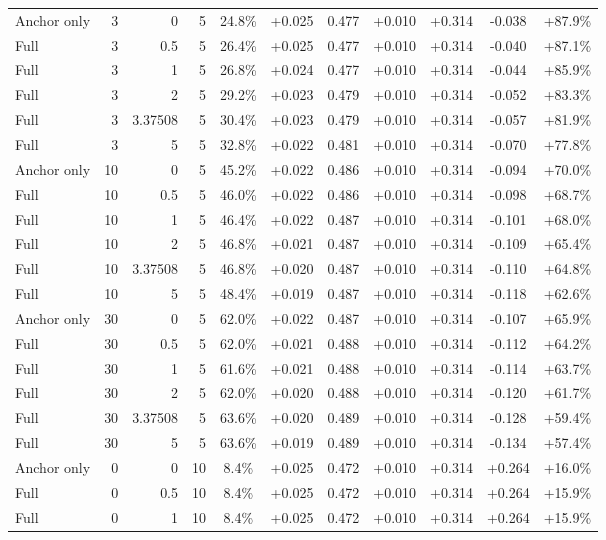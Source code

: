 \begin{table}[htbp]
\begin{tabular}{lrrrccccccc}
Anchor only & 3 & 0 & 5 & 24.8\% & +0.025 & 0.477 & +0.010 & +0.314 & -0.038 & +87.9\% \\
Full & 3 & 0.5 & 5 & 26.4\% & +0.025 & 0.477 & +0.010 & +0.314 & -0.040 & +87.1\% \\
Full & 3 & 1 & 5 & 26.8\% & +0.024 & 0.477 & +0.010 & +0.314 & -0.044 & +85.9\% \\
Full & 3 & 2 & 5 & 29.2\% & +0.023 & 0.479 & +0.010 & +0.314 & -0.052 & +83.3\% \\
Full & 3 & 3.37508 & 5 & 30.4\% & +0.023 & 0.479 & +0.010 & +0.314 & -0.057 & +81.9\% \\
Full & 3 & 5 & 5 & 32.8\% & +0.022 & 0.481 & +0.010 & +0.314 & -0.070 & +77.8\% \\
Anchor only & 10 & 0 & 5 & 45.2\% & +0.022 & 0.486 & +0.010 & +0.314 & -0.094 & +70.0\% \\
Full & 10 & 0.5 & 5 & 46.0\% & +0.022 & 0.486 & +0.010 & +0.314 & -0.098 & +68.7\% \\
Full & 10 & 1 & 5 & 46.4\% & +0.022 & 0.487 & +0.010 & +0.314 & -0.101 & +68.0\% \\
Full & 10 & 2 & 5 & 46.8\% & +0.021 & 0.487 & +0.010 & +0.314 & -0.109 & +65.4\% \\
Full & 10 & 3.37508 & 5 & 46.8\% & +0.020 & 0.487 & +0.010 & +0.314 & -0.110 & +64.8\% \\
Full & 10 & 5 & 5 & 48.4\% & +0.019 & 0.487 & +0.010 & +0.314 & -0.118 & +62.6\% \\
Anchor only & 30 & 0 & 5 & 62.0\% & +0.022 & 0.487 & +0.010 & +0.314 & -0.107 & +65.9\% \\
Full & 30 & 0.5 & 5 & 62.0\% & +0.021 & 0.488 & +0.010 & +0.314 & -0.112 & +64.2\% \\
Full & 30 & 1 & 5 & 61.6\% & +0.021 & 0.488 & +0.010 & +0.314 & -0.114 & +63.7\% \\
Full & 30 & 2 & 5 & 62.0\% & +0.020 & 0.488 & +0.010 & +0.314 & -0.120 & +61.7\% \\
Full & 30 & 3.37508 & 5 & 63.6\% & +0.020 & 0.489 & +0.010 & +0.314 & -0.128 & +59.4\% \\
Full & 30 & 5 & 5 & 63.6\% & +0.019 & 0.489 & +0.010 & +0.314 & -0.134 & +57.4\% \\
Anchor only & 0 & 0 & 10 & 8.4\% & +0.025 & 0.472 & +0.010 & +0.314 & +0.264 & +16.0\% \\
Full & 0 & 0.5 & 10 & 8.4\% & +0.025 & 0.472 & +0.010 & +0.314 & +0.264 & +15.9\% \\
Full & 0 & 1 & 10 & 8.4\% & +0.025 & 0.472 & +0.010 & +0.314 & +0.264 & +15.9\% \\

\end{tabular}
\end{table}
